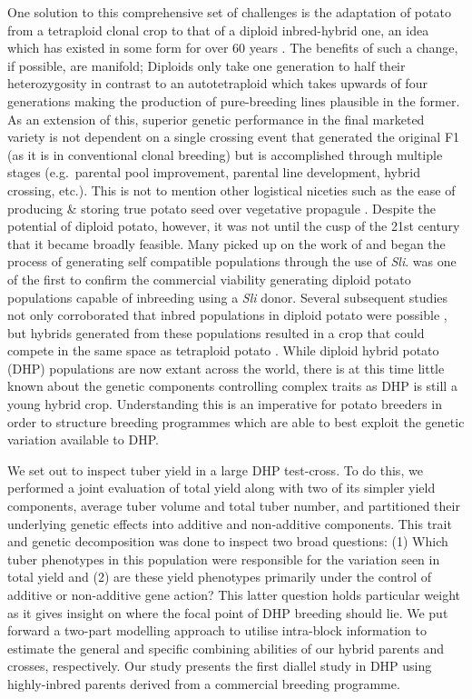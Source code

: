 One solution to this comprehensive set of challenges is the adaptation of potato from a tetraploid clonal crop to that of a diploid inbred-hybrid one, an idea which has existed in some form for over 60 years \citep{Hougas1958}. The benefits of such a change, if possible, are manifold; Diploids only take one generation to half their heterozygosity in contrast to an autotetraploid which takes upwards of four generations making the production of pure-breeding lines plausible in the former. As an extension of this, superior genetic performance in the final marketed variety is not dependent on a single crossing event that generated the original F1 (as it is in conventional clonal breeding) but is accomplished through multiple stages (e.g.~parental pool improvement, parental line development, hybrid crossing, etc.). This is not to mention other logistical niceties such as the ease of producing \& storing true potato seed over vegetative propagule \citep{Cock1983, Pallais1991, Thomas-Sharma2016}. Despite the potential of diploid potato, however, it was not until the cusp of the 21st century that it became broadly feasible. Many picked up on the work of \citep{Hosaka1998} and began the process of generating self compatible populations through the use of \emph{Sli}. \citep{Lindhout2011} was one of the first to confirm the commercial viability generating diploid potato populations capable of inbreeding using a \emph{Sli} donor. Several subsequent studies not only corroborated that inbred populations in diploid potato were possible \citep{Alsahlany2021}, but hybrids generated from these populations resulted in a crop that could compete in the same space as tetraploid potato \citep{Stockem2020, Zhang2021}. While diploid hybrid potato (DHP) populations are now extant across the world, there is at this time little known about the genetic components controlling complex traits as DHP is still a young hybrid crop. Understanding this is an imperative for potato breeders in order to structure breeding programmes which are able to best exploit the genetic variation available to DHP.

We set out to inspect tuber yield in a large DHP test-cross. To do this, we performed a joint evaluation of total yield along with two of its simpler yield components, average tuber volume and total tuber number, and partitioned their underlying genetic effects into additive and non-additive components. This trait and genetic decomposition was done to inspect two broad questions: (1) Which tuber phenotypes in this population were responsible for the variation seen in total yield and (2) are these yield phenotypes primarily under the control of additive or non-additive gene action? This latter question holds particular weight as it gives insight on where the focal point of DHP breeding should lie. We put forward a two-part modelling approach to utilise intra-block information to estimate the general and specific combining abilities of our hybrid parents and crosses, respectively. Our study presents the first diallel study in DHP using highly-inbred parents derived from a commercial breeding programme.


